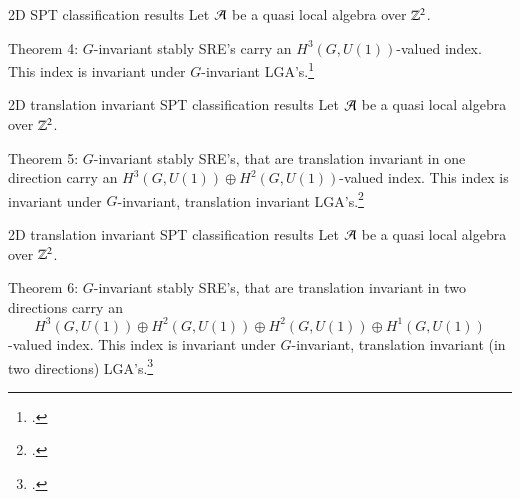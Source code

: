 \documentclass{beamer}
\begin{document}
\begin{frame}{2D SPT classification results}
Let $\AA$ be a quasi local algebra over $\ZZ^2$.
\begin{block}{Theorem 4:}
$G$-invariant stably SRE's carry an $H^3(G,U(1))$-valued index. This index is invariant under $G$-invariant LGA's.\footcite{ogata2021h3gmathbb}
\end{block}
\end{frame}

\begin{frame}{2D translation invariant SPT classification results}
Let $\AA$ be a quasi local algebra over $\ZZ^2$.
\begin{block}{Theorem 5:}
$G$-invariant stably SRE's, that are translation invariant in one direction carry an $H^3(G,U(1))\oplus H^2(G,U(1))$-valued index. This index is invariant under $G$-invariant, translation invariant LGA's.\footcite{https://doi.org/10.48550/arxiv.2202.11758}
\end{block}
\end{frame}

\begin{frame}{2D translation invariant SPT classification results}
Let $\AA$ be a quasi local algebra over $\ZZ^2$.
\begin{block}{Theorem 6:}
$G$-invariant stably SRE's, that are translation invariant in two directions carry an
\[H^3(G,U(1))\oplus H^2(G,U(1))\oplus H^2(G,U(1))\oplus H^1(G,U(1))\]
-valued index. This index is invariant under $G$-invariant, translation invariant (in two directions) LGA's.\footcite{https://doi.org/10.48550/arxiv.2202.11758}
\end{block}
\end{frame}
\end{document}
